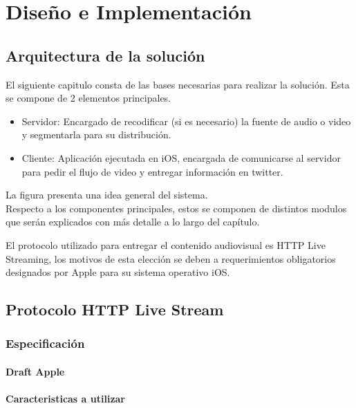 \chapter{Diseño e Implementación}
\section{Arquitectura de la solución}
El siguiente capitulo consta de las bases necesarias para realizar la solución. Esta se compone de 2 elementos principales. 
\begin{itemize}
\item Servidor: Encargado de recodificar (si es necesario) la fuente de audio o video y segmentarla para su distribución.
\item Cliente: Aplicación ejecutada en iOS, encargada de comunicarse al servidor para pedir el flujo de video y entregar información en twitter.
\end{itemize}
La figura presenta una idea general del sistema.\\

Respecto a los componentes principales, estos se componen de distintos modulos que serán explicados con más detalle a lo largo del capítulo.

El protocolo utilizado para entregar el contenido audiovisual es HTTP Live Streaming, los motivos de esta elección se deben a requerimientos obligatorios designados por Apple para su sistema operativo iOS.


\section{Protocolo HTTP Live Stream}
	\subsection{Especificación}
		\subsubsection{Draft Apple}
		\subsubsection{Caracteristicas a utilizar}
			
